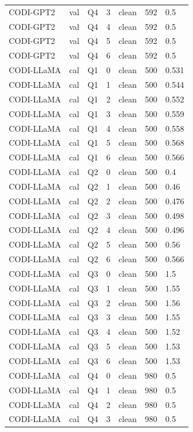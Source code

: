 \begin{longtable}{@{}p{}p{}p{}p{}p{}p{}p{}@{}}
CODI-GPT2 & val & Q4 & 3 & clean & 592 & 0.5 \\
CODI-GPT2 & val & Q4 & 4 & clean & 592 & 0.5 \\
CODI-GPT2 & val & Q4 & 5 & clean & 592 & 0.5 \\
CODI-GPT2 & val & Q4 & 6 & clean & 592 & 0.5 \\
CODI-LLaMA & cal & Q1 & 0 & clean & 500 & 0.531 \\
CODI-LLaMA & cal & Q1 & 1 & clean & 500 & 0.544 \\
CODI-LLaMA & cal & Q1 & 2 & clean & 500 & 0.552 \\
CODI-LLaMA & cal & Q1 & 3 & clean & 500 & 0.559 \\
CODI-LLaMA & cal & Q1 & 4 & clean & 500 & 0.558 \\
CODI-LLaMA & cal & Q1 & 5 & clean & 500 & 0.568 \\
CODI-LLaMA & cal & Q1 & 6 & clean & 500 & 0.566 \\
CODI-LLaMA & cal & Q2 & 0 & clean & 500 & 0.4 \\
CODI-LLaMA & cal & Q2 & 1 & clean & 500 & 0.46 \\
CODI-LLaMA & cal & Q2 & 2 & clean & 500 & 0.476 \\
CODI-LLaMA & cal & Q2 & 3 & clean & 500 & 0.498 \\
CODI-LLaMA & cal & Q2 & 4 & clean & 500 & 0.496 \\
CODI-LLaMA & cal & Q2 & 5 & clean & 500 & 0.56 \\
CODI-LLaMA & cal & Q2 & 6 & clean & 500 & 0.566 \\
CODI-LLaMA & cal & Q3 & 0 & clean & 500 & 1.5 \\
CODI-LLaMA & cal & Q3 & 1 & clean & 500 & 1.55 \\
CODI-LLaMA & cal & Q3 & 2 & clean & 500 & 1.56 \\
CODI-LLaMA & cal & Q3 & 3 & clean & 500 & 1.55 \\
CODI-LLaMA & cal & Q3 & 4 & clean & 500 & 1.52 \\
CODI-LLaMA & cal & Q3 & 5 & clean & 500 & 1.53 \\
CODI-LLaMA & cal & Q3 & 6 & clean & 500 & 1.53 \\
CODI-LLaMA & cal & Q4 & 0 & clean & 980 & 0.5 \\
CODI-LLaMA & cal & Q4 & 1 & clean & 980 & 0.5 \\
CODI-LLaMA & cal & Q4 & 2 & clean & 980 & 0.5 \\
CODI-LLaMA & cal & Q4 & 3 & clean & 980 & 0.5 \\

\end{longtable}
